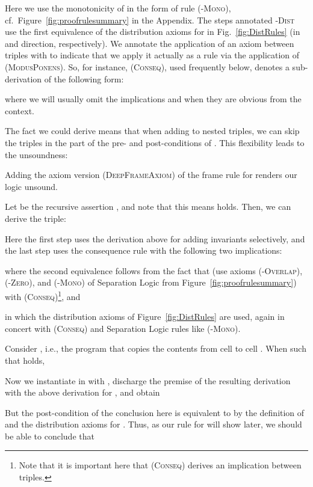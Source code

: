 \documentclass{LMCS}
\theoremstyle{remark}
\begin{document}
Here we use the monotonicity of  in the form of rule (\textsc{-Mono}), cf.~Figure~\ref{fig:proofrulesummary} in the Appendix.
The steps annotated  \textsc{-Dist} use the first equivalence    
of the distribution axioms for  in Fig.~\ref{fig:DistRules} 
(in  and  direction, respectively).
We annotate the application of an axiom between triples with  to indicate that we apply  it actually as a rule via the application of (\textsc{ModusPonens}). So, for instance,   (\textsc{Conseq}), used frequently below,   denotes   a sub-derivation of the following form:


where we  will usually omit the implications   and  when they are obvious from the context.

The fact we could derive  means that
when adding  to nested triples, we can skip the triples in the  part of
the pre- and post-conditions of . 
This flexibility leads to the unsoundness:
\begin{prop}
\label{prop:DeepFrameUnsound}
Adding the axiom version (\textsc{DeepFrameAxiom}) of the frame rule for  renders our logic
unsound.
\end{prop}
\proof
Let  be the recursive assertion , and note  that this means   
 holds.
Then, we can derive the triple:
 
 
Here the first step uses the derivation above for adding invariants 
selectively, and the last step uses the consequence rule with
the following two implications:


where the second equivalence follows from  the fact that  (use axioms (-\textsc{Overlap}), (-\textsc{Zero}), and (\textsc{-Mono}) of   Separation Logic from  Figure~\ref{fig:proofrulesummary})       with (\textsc{Conseq})\footnote{Note that it is important here that (\textsc{Conseq})  derives an implication between triples.}, and
 
in which the distribution axioms of  Figure~\ref{fig:DistRules} are used, again in concert with (\textsc{Conseq}) and Separation Logic rules like (\textsc{-Mono}).
 
Consider , i.e., the program that copies the contents from cell  to cell .
When  such that  holds,

 
Now we instantiate  in  with ,
discharge the premise of the resulting derivation
with the above derivation for , and obtain
 
But the post-condition of the conclusion here is equivalent to
 by the definition of  and 
the distribution axioms for . Thus, as our rule for 
will show later, we should be able to conclude that
\end{document}
